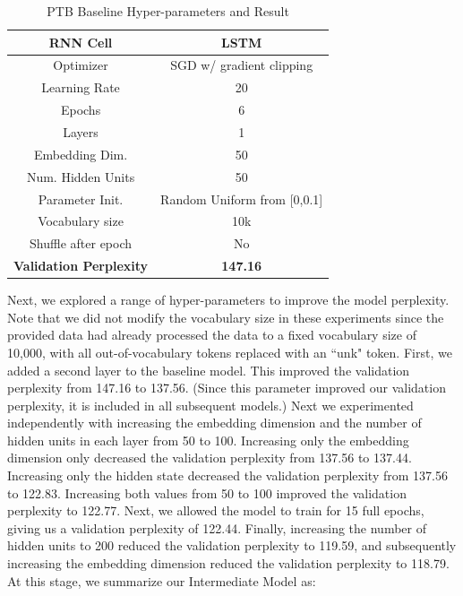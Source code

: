 \documentclass[a4paper]{article}
\begin{document}
\begin{table}[h]
\centering
\begin{tabular}{|c | c|} 
 \hline
RNN Cell & LSTM\\ \hline
Optimizer & SGD w/ gradient clipping \\ \hline
Learning Rate & 20 \\ \hline
Epochs & 6\\ \hline
Layers & 1\\ \hline
Embedding Dim. & 50\\ \hline
Num. Hidden Units & 50\\ \hline
Parameter Init. & Random Uniform from [0,0.1]\\ \hline
Vocabulary size & 10k\\ \hline
Shuffle after epoch & No \\ \hline
\textbf{Validation Perplexity} &\textbf{147.16} \\ \hline
\end{tabular}
\caption{PTB Baseline Hyper-parameters and Result}
\label{table:1}
\end{table}

Next, we explored a range of hyper-parameters to improve the model perplexity. Note that we did not modify the vocabulary size in these experiments since the provided data had already processed the data to a fixed vocabulary size of 10,000, with all out-of-vocabulary tokens replaced with an ``unk" token. 
\newline
\newline
First, we added a second layer to the baseline model. This improved the validation perplexity from 147.16 to 137.56. (Since this parameter improved our validation perplexity, it is included in all subsequent models.) Next we experimented independently with increasing the embedding dimension and the number of hidden units in each layer from 50 to 100. Increasing only the embedding dimension only decreased the validation perplexity from 137.56 to 137.44. Increasing only the hidden state decreased the validation perplexity from 137.56 to 122.83. Increasing both values from 50 to 100 improved the validation perplexity to 122.77. Next, we allowed the model to train for 15 full epochs, giving us a validation perplexity of 122.44. Finally, increasing the number of hidden units to 200 reduced the validation perplexity to 119.59, and subsequently increasing the embedding dimension reduced the validation perplexity to 118.79.
\newline
\newline
At this stage, we summarize our Intermediate Model as:
\end{document}
